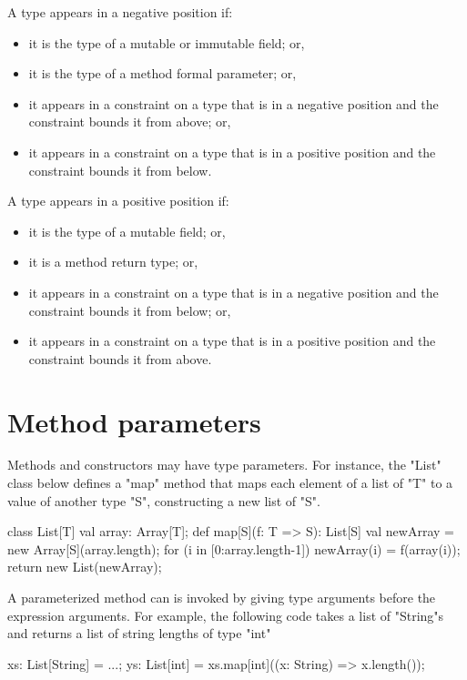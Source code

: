 \documentclass{llncs}
\begin{document}
%
A type appears in a negative position if:
\begin{itemize}
\item it is the type of a mutable or immutable field; or,
\item it is the type of a method formal parameter; or,
\item it appears in a constraint on a type that is in a negative position 
and the constraint bounds it from above; or,
\item it appears in a constraint on a type that is in a positive position 
and the constraint bounds it from below.
\end{itemize}
%
A type appears in a positive position if:
\begin{itemize}
\item it is the type of a mutable field; or,
\item it is a method return type; or,
\item it appears in a constraint on a type that is in a negative position 
and the constraint bounds it from below; or,
\item it appears in a constraint on a type that is in a positive position 
and the constraint bounds it from above.
\end{itemize}
\fi

\section{Method parameters}

Methods and constructors may have type parameters.
For instance, the \xcd"List" class below defines a \xcd"map"
method that maps each element of a list of \xcd"T"
to a value of another type \xcd"S", constructing a new list of
\xcd"S".
\begin{xten}
class List[T] {
    val array: Array[T];
    def map[S](f: T => S): List[S] {
        val newArray = new Array[S](array.length);
        for (i in [0:array.length-1]) {
            newArray(i) = f(array(i));
        }
        return new List(newArray);
    }
}
\end{xten}


A parameterized method can is invoked by giving type arguments before the 
expression arguments.  For example, the following code takes a
list of \xcd"String"s and returns a list of string lengths of
type \xcd"int"
\begin{xten}
xs: List[String] = ...;
ys: List[int] = xs.map[int]((x: String) => x.length());
\end{xten}
\end{document}
